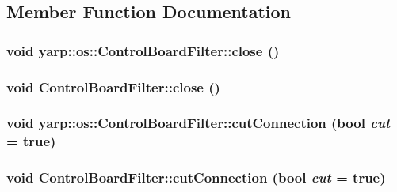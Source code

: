 \subsection{Member Function Documentation}
\hypertarget{classyarp_1_1os_1_1_control_board_filter_acb354b5aea9ec25a99aa57ce4781b56d}{
\subsubsection[{close}]{\setlength{\rightskip}{0pt plus 5cm}void yarp::os::ControlBoardFilter::close ()}}
\label{classyarp_1_1os_1_1_control_board_filter_acb354b5aea9ec25a99aa57ce4781b56d}
\hypertarget{classyarp_1_1os_1_1_control_board_filter_a6224733f849144002f5b0f89f30ffb17}{
\subsubsection[{close}]{\setlength{\rightskip}{0pt plus 5cm}void ControlBoardFilter::close ()}}
\label{classyarp_1_1os_1_1_control_board_filter_a6224733f849144002f5b0f89f30ffb17}
\hypertarget{classyarp_1_1os_1_1_control_board_filter_a7d49e4c935446a6523f9504510d556c6}{
\subsubsection[{cutConnection}]{\setlength{\rightskip}{0pt plus 5cm}void yarp::os::ControlBoardFilter::cutConnection (bool {\em cut} = {\ttfamily true})}}
\label{classyarp_1_1os_1_1_control_board_filter_a7d49e4c935446a6523f9504510d556c6}
\hypertarget{classyarp_1_1os_1_1_control_board_filter_a97baafa3310ec3ecad9c348c29c8b09c}{
\subsubsection[{cutConnection}]{\setlength{\rightskip}{0pt plus 5cm}void ControlBoardFilter::cutConnection (bool {\em cut} = {\ttfamily true})}}
